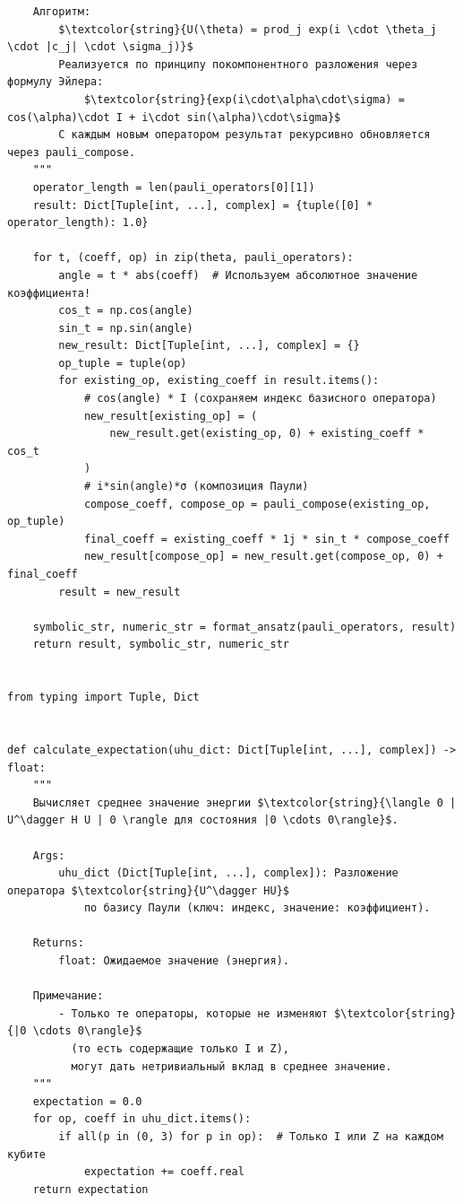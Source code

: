 \documentclass[a4paper]{report}
\begin{document}
\begin{lstlisting}
    Алгоритм:
        $\textcolor{string}{U(\theta) = prod_j exp(i \cdot \theta_j \cdot |c_j| \cdot \sigma_j)}$
        Реализуется по принципу покомпонентного разложения через формулу Эйлера:
            $\textcolor{string}{exp(i\cdot\alpha\cdot\sigma) = cos(\alpha)\cdot I + i\cdot sin(\alpha)\cdot\sigma}$
        С каждым новым оператором результат рекурсивно обновляется через pauli_compose.
    """
    operator_length = len(pauli_operators[0][1])
    result: Dict[Tuple[int, ...], complex] = {tuple([0] * operator_length): 1.0}

    for t, (coeff, op) in zip(theta, pauli_operators):
        angle = t * abs(coeff)  # Используем абсолютное значение коэффициента!
        cos_t = np.cos(angle)
        sin_t = np.sin(angle)
        new_result: Dict[Tuple[int, ...], complex] = {}
        op_tuple = tuple(op)
        for existing_op, existing_coeff in result.items():
            # cos(angle) * I (сохраняем индекс базисного оператора)
            new_result[existing_op] = (
                new_result.get(existing_op, 0) + existing_coeff * cos_t
            )
            # i*sin(angle)*σ (композиция Паули)
            compose_coeff, compose_op = pauli_compose(existing_op, op_tuple)
            final_coeff = existing_coeff * 1j * sin_t * compose_coeff
            new_result[compose_op] = new_result.get(compose_op, 0) + final_coeff
        result = new_result

    symbolic_str, numeric_str = format_ansatz(pauli_operators, result)
    return result, symbolic_str, numeric_str


from typing import Tuple, Dict


def calculate_expectation(uhu_dict: Dict[Tuple[int, ...], complex]) -> float:
    """
    Вычисляет среднее значение энергии $\textcolor{string}{\langle 0 | U^\dagger H U | 0 \rangle для состояния |0 \cdots 0\rangle}$.

    Args:
        uhu_dict (Dict[Tuple[int, ...], complex]): Разложение оператора $\textcolor{string}{U^\dagger HU}$
            по базису Паули (ключ: индекс, значение: коэффициент).

    Returns:
        float: Ожидаемое значение (энергия).

    Примечание:
        - Только те операторы, которые не изменяют $\textcolor{string}{|0 \cdots 0\rangle}$
          (то есть содержащие только I и Z),
          могут дать нетривиальный вклад в среднее значение.
    """
    expectation = 0.0
    for op, coeff in uhu_dict.items():
        if all(p in (0, 3) for p in op):  # Только I или Z на каждом кубите
            expectation += coeff.real
    return expectation



\end{lstlisting}
\end{document}
